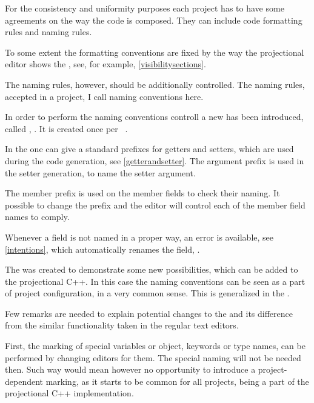 For the consistency and uniformity purposes each project has to have some agreements on the way the code is composed.
They can include code formatting rules and naming rules. 

To some extent the formatting conventions are fixed by the way the projectional editor shows the 
, see, for example, \ref{visibilitysections}.

The naming rules, however, should be additionally controlled. The naming rules, accepted in a project, I call 
naming conventions here.

In order to perform the naming conventions controll a new  has been introduced, called , 
. It is created once per \jbmps\ .


In the  one can give a standard prefixes for getters and setters, which are used during the code 
generation, see \ref{getterandsetter}. The argument prefix is used in the setter generation, to name the
setter argument.

The member prefix is used on the member fields to check their naming. It possible to change the prefix and the editor will control
each of the member field names to comply.

Whenever a field is not named in a proper way, an error  is available, see \ref{intentions}, 
which automatically renames the field, .


The   was created to demonstrate some new possibilities, which can be added to the projectional C++.
In this case the naming conventions can be seen as a part of project configuration, in a very common sense. This is generalized in the
.

Few remarks are needed to explain potential changes to the   and its difference from the similar functionality taken
in the regular text editors.

First, the marking of special variables or object, keywords or type names, can be performed by changing editors for them. The special
naming will not be needed then. Such way would mean however no opportunity to introduce a project-dependent marking, as it starts to be
common for all projects, being a part of the projectional C++ implementation.

